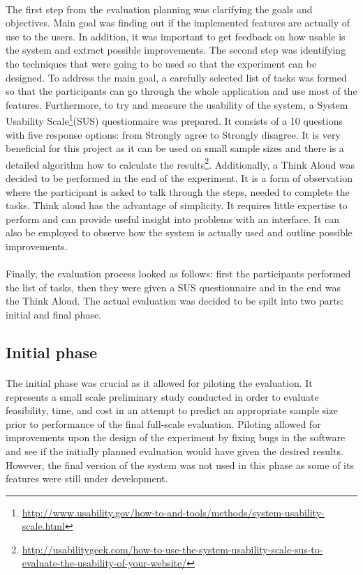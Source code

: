 \documentclass{l4proj}
\begin{document}
\paragraph{}
The first step from the evaluation planning was clarifying the goals and objectives. Main goal was finding out if the implemented features are actually of use to the users. In addition, it was important to get feedback on how usable is the system and extract possible improvements. The second step was identifying the techniques that were going to be used so that the experiment can be designed. To address the main goal,  a carefully selected list of tasks was formed so that the participants can go through the whole application and use most of the features. Furthermore, to try and measure the usability of the system, a System Usability Scale\footnote{\url{http://www.usability.gov/how-to-and-tools/methods/system-usability-scale.html}}(SUS) questionnaire was prepared. It consists of a 10 questions with five response options: from Strongly agree to Strongly disagree. It is very beneficial for this project as it can be used on small sample sizes and there is a detailed algorithm how to calculate the results\footnote{\url{http://usabilitygeek.com/how-to-use-the-system-usability-scale-sus-to-evaluate-the-usability-of-your-website/}}. Additionally, a Think Aloud was decided to be performed in the end of the experiment. It is a form of observation where the participant is asked to talk through the steps, needed to complete the tasks\cite{hci}. Think aloud has the advantage of simplicity. It requires little expertise to perform and can provide useful insight into problems with an interface. It can also be employed to observe how the system is actually used and outline possible improvements.
\paragraph{} 
 Finally, the evaluation process looked as follows: first the participants performed the list of tasks, then they were given a SUS questionnaire and in the end was the Think Aloud. The actual evaluation was decided to be spilt into two parts: initial and final phase.
\subsection{Initial phase}
\paragraph{}
The initial phase was crucial as it allowed for piloting the evaluation. It represents a small scale preliminary study conducted in order to evaluate feasibility, time, and cost in an attempt to predict an appropriate sample size prior to performance of the final full-scale evaluation\cite{clinicalresearch}. Piloting allowed for improvements upon the design of the experiment by fixing bugs in the software and see if the initially planned evaluation would have given the desired results. However, the final version of the system was not used in this phase as some of its features were still under development. 
\end{document}
